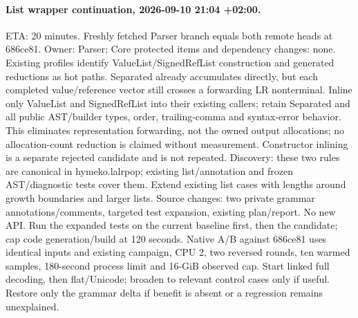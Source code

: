 \documentclass[11pt,a4paper]{article}
\begin{document}
\paragraph{List wrapper continuation, 2026-09-10 21:04 +02:00.}
ETA: 20 minutes. Freshly fetched Parser branch equals both remote heads at
686ce81. Owner: Parser; Core protected items and dependency changes: none.
Existing profiles identify ValueList/SignedRefList construction and generated
reductions as hot paths. Separated already accumulates directly, but each completed
value/reference vector still crosses a forwarding LR nonterminal. Inline only
ValueList and SignedRefList into their existing callers; retain Separated and all
public AST/builder types, order, trailing-comma and syntax-error behavior.
This eliminates representation forwarding, not the owned output allocations;
no allocation-count reduction is claimed without measurement. Constructor
inlining is a separate rejected candidate and is not repeated.
Discovery: these two rules are canonical in hymeko.lalrpop; existing list/annotation
and frozen AST/diagnostic tests cover them. Extend existing list cases with lengths
around growth boundaries and larger lists. Source changes: two private grammar
annotations/comments, targeted test expansion, existing plan/report. No new API.
Run the expanded tests on the current baseline first, then the candidate; cap
code generation/build at 120 seconds. Native A/B against 686ce81 uses identical
inputs and existing campaign, CPU 2, two reversed rounds, ten warmed samples,
180-second process limit and 16-GiB observed cap. Start linked full decoding,
then flat/Unicode; broaden to relevant control cases only if useful. Restore
only the grammar delta if benefit is absent or a regression remains unexplained.
\end{document}
